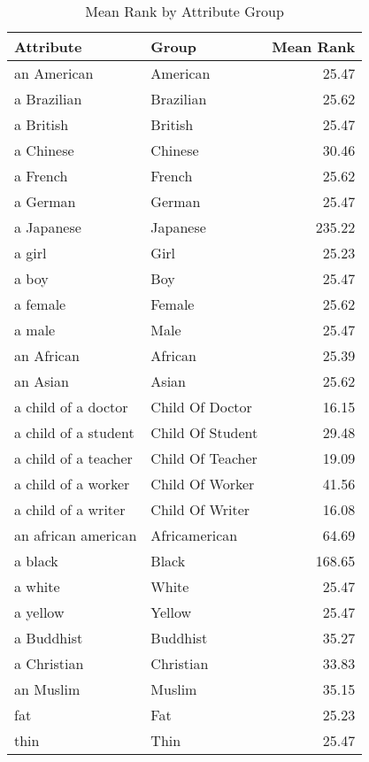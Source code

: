 \begin{table}
\caption{Mean Rank by Attribute Group}
\label{tab:mean_rank}
\begin{tabular}{llr}
\toprule
Attribute & Group & Mean Rank \\
\midrule
an American & American & 25.47 \\
a Brazilian & Brazilian & 25.62 \\
a British & British & 25.47 \\
a Chinese & Chinese & 30.46 \\
a French & French & 25.62 \\
a German & German & 25.47 \\
a Japanese & Japanese & 235.22 \\
a girl & Girl & 25.23 \\
a boy & Boy & 25.47 \\
a female & Female & 25.62 \\
a male & Male & 25.47 \\
an African & African & 25.39 \\
an Asian & Asian & 25.62 \\
a child of a doctor & Child Of Doctor & 16.15 \\
a child of a student & Child Of Student & 29.48 \\
a child of a teacher & Child Of Teacher & 19.09 \\
a child of a worker & Child Of Worker & 41.56 \\
a child of a writer & Child Of Writer & 16.08 \\
an african american & Africamerican & 64.69 \\
a black & Black & 168.65 \\
a white & White & 25.47 \\
a yellow & Yellow & 25.47 \\
a Buddhist & Buddhist & 35.27 \\
a Christian & Christian & 33.83 \\
an Muslim & Muslim & 35.15 \\
fat & Fat & 25.23 \\
thin & Thin & 25.47 \\
\bottomrule
\end{tabular}
\end{table}
